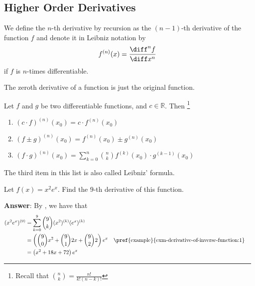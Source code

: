 \subsection{Higher Order Derivatives}\label{subsec-higher-order-derivatives}

\begin{definition}\label{def-higher-order-derivatives}
	We define the $n$-th derivative by recursion as the $(n-1)$-th derivative of
	the function $f$ and denote it in Leibniz notation by
	\begin{equation}
		f^{(n)}(x) = \frac{\diff^n f}{\diff x^n}
	\end{equation}
	if $f$ is $n$-times differentiable.
\end{definition}

\begin{rem}
	The zeroth derivative of a function is just the original function.
\end{rem}

\begin{thm}\label{thm-higher-order-derivative-arithmetic}
	Let $f$ and $g$ be two differentiable functions, and $c\in\mathbb{R}$. Then
	\footnote{Recall that $\binom{n}{k}=\tfrac{n!}{k!(n-k)!}$}
	\begin{enumerate}
		\item $(c\cdot f)^{(n)}(x_0) = c \cdot f^{(n)}(x_0)$
		\item $(f \pm g)^{(n)}(x_0) = f^{(n)}(x_0) \pm g^{(n)}(x_0)$
		\item $(f \cdot g)^{(n)}(x_0) = \sum_{k=0}^n \binom{n}{k}f^{(k)}(x_0) \cdot g^{(k-1)}(x_0)$
	\end{enumerate}
	The third item in this list is also called Leibniz' formula.
\end{thm}

\begin{exm}
	Let $f(x)=x^2e^x$. Find the $9$-th derivative of this function.
	\begin{flushleft}
		\textbf{Answer}: By ,
		we have that
		\begin{align*}
			(x^2e^x)^{(9)} & = \sum_{k=0}^9\binom{9}{k}(x^2)^{(k)}(e^x)^{(k)}                                                                                \\
			               & = \left(\binom{9}{0}x^2+\binom{9}{1}2x+\binom{9}{2}2\right)e^x &  & \text{\pref{example}{exm-derivative-of-inverse-function:1}} \\
			               & = \left(x^2+18x+72\right)e^x
		\end{align*}
	\end{flushleft}
\end{exm}

